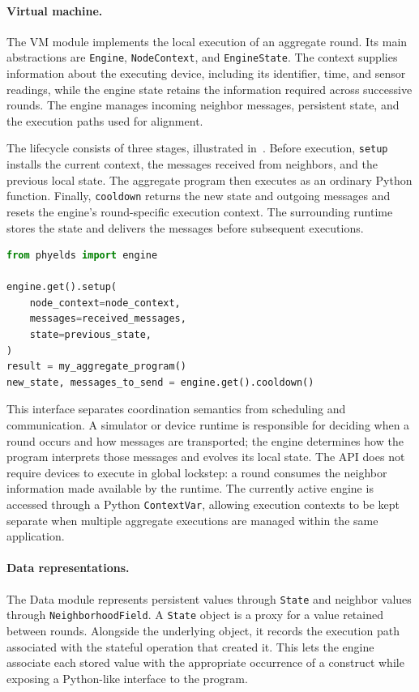 \paragraph{Virtual machine.}
The VM module implements the local execution of an aggregate round.
%
Its main abstractions are \texttt{Engine}, \texttt{NodeContext}, and
 \texttt{EngineState}.
%
The context supplies information about the executing device, including its
 identifier, time, and sensor readings, while the engine state retains the
 information required across successive rounds.
%
The engine manages incoming neighbor messages, persistent state, and the
 execution paths used for alignment.

The lifecycle consists of three stages, illustrated
 in~.
%
Before execution, \texttt{setup} installs the current context, the messages
 received from neighbors, and the previous local state.
%
The aggregate program then executes as an ordinary Python function.
%
Finally, \texttt{cooldown} returns the new state and outgoing messages and
 resets the engine's round-specific execution context.
%
The surrounding runtime stores the state and delivers the messages before
 subsequent executions.

\begin{lstlisting}[language=Python,breaklines=true,
  caption={Lifecycle of an aggregate round in Phyelds.},
  label={lst:phyelds-engine}]
from phyelds import engine

engine.get().setup(
    node_context=node_context,
    messages=received_messages,
    state=previous_state,
)
result = my_aggregate_program()
new_state, messages_to_send = engine.get().cooldown()
\end{lstlisting}

This interface separates coordination semantics from scheduling and
 communication.
%
A simulator or device runtime is responsible for deciding when a round
 occurs and how messages are transported; the engine determines how the
 program interprets those messages and evolves its local state.
%
The API does not require devices to execute in global lockstep: a round
 consumes the neighbor information made available by the runtime.
%
The currently active engine is accessed through a Python
 \texttt{ContextVar}, allowing execution contexts to be kept separate
 when multiple aggregate executions are managed within the same application.

\paragraph{Data representations.}
The Data module represents persistent values through \texttt{State}
 and neighbor values through \texttt{NeighborhoodField}.
%
A \texttt{State} object is a proxy for a value retained between rounds.
%
Alongside the underlying object, it records the execution path associated
 with the stateful operation that created it.
%
This lets the engine associate each stored value with the appropriate
 occurrence of a construct while exposing a Python-like interface to the program.

